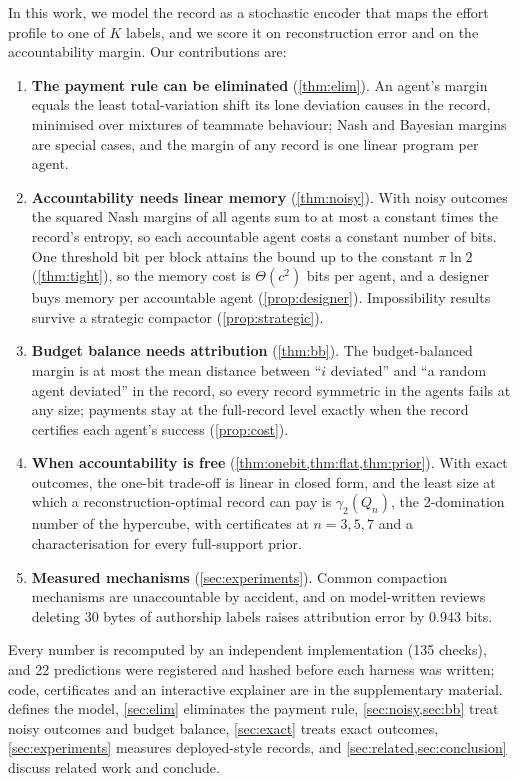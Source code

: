 \documentclass[sigconf,anonymous,acmthm=false]{acmart}
\theoremstyle{acmplain}
\theoremstyle{acmdefinition}
\begin{document}
In this work, we model the record as a stochastic encoder that maps the effort profile to
one of $K$ labels, and we score it on reconstruction error and on the accountability margin.
Our contributions are:
\begin{enumerate}
\item \textbf{The payment rule can be eliminated} (\cref{thm:elim}). An agent's margin
equals the least total-variation shift its lone deviation causes in the record, minimised
over mixtures of teammate behaviour; Nash and Bayesian margins are special cases, and the
margin of any record is one linear program per agent.
\item \textbf{Accountability needs linear memory} (\cref{thm:noisy}). With noisy outcomes the
squared Nash margins of all agents sum to at most a constant times the record's entropy, so
each accountable agent costs a constant number of bits. One threshold bit per block attains
the bound up to the constant $\pi\ln2$ (\cref{thm:tight}), so the memory cost is
$\Theta(c^2)$ bits per agent, and a designer buys memory per accountable agent
(\cref{prop:designer}). Impossibility results survive a strategic compactor
(\cref{prop:strategic}).
\item \textbf{Budget balance needs attribution} (\cref{thm:bb}). The budget-balanced margin is
at most the mean distance between ``$i$ deviated'' and ``a random agent deviated'' in the
record, so every record symmetric in the agents fails at any size; payments stay at the
full-record level exactly when the record certifies each agent's success
(\cref{prop:cost}).
\item \textbf{When accountability is free} (\cref{thm:onebit,thm:flat,thm:prior}). With exact
outcomes, the one-bit trade-off is linear in closed form, and the least size at which a
reconstruction-optimal record can pay is $\gamma_2(Q_n)$, the 2-domination number of the
hypercube, with certificates at $n=3,5,7$ and a characterisation for every full-support
prior.
\item \textbf{Measured mechanisms} (\cref{sec:experiments}). Common compaction mechanisms are
unaccountable by accident, and on model-written reviews deleting 30 bytes of authorship
labels raises attribution error by 0.943 bits.
\end{enumerate}
Every number is recomputed by an independent implementation (135 checks), and 22
predictions were registered and hashed before each harness was written; code, certificates
and an interactive explainer are in the supplementary material. 
defines the model, \cref{sec:elim} eliminates the payment rule, \cref{sec:noisy,sec:bb}
treat noisy outcomes and budget balance, \cref{sec:exact} treats exact outcomes,
\cref{sec:experiments} measures deployed-style records, and
\cref{sec:related,sec:conclusion} discuss related work and conclude.
\end{document}
